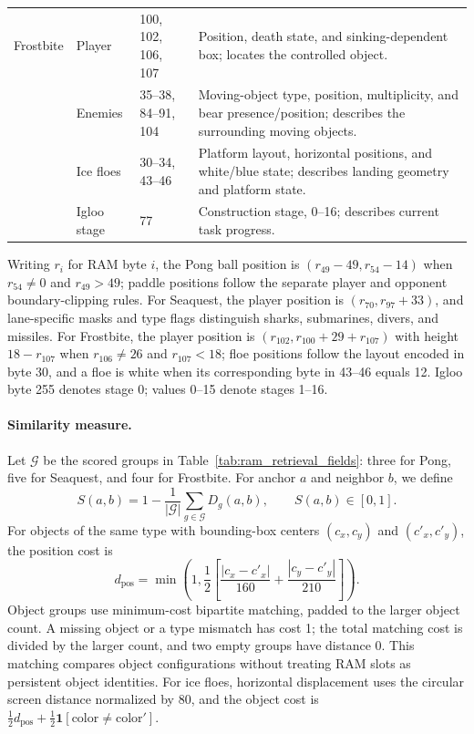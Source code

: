 \documentclass{article} %
\begin{document}
\begin{table}[!htbp]
\begin{tabular}{@{}p{}p{}p{}p{}@{}}
\midrule
Frostbite & Player & 100, 102, 106, 107 & Position, death state, and sinking-dependent box; locates the controlled object. \\
 & Enemies & 35--38, 84--91, 104 & Moving-object type, position, multiplicity, and bear presence/position; describes the surrounding moving objects. \\
 & Ice floes & 30--34, 43--46 & Platform layout, horizontal positions, and white/blue state; describes landing geometry and platform state. \\
 & Igloo stage & 77 & Construction stage, 0--16; describes current task progress. \\
\bottomrule
\end{tabular}
\end{table}

Writing $r_i$ for RAM byte $i$, the Pong ball position is $(r_{49}-49,r_{54}-14)$ when $r_{54}\neq0$ and $r_{49}>49$; paddle positions follow the separate player and opponent boundary-clipping rules. For Seaquest, the player position is $(r_{70},r_{97}+33)$, and lane-specific masks and type flags distinguish sharks, submarines, divers, and missiles. For Frostbite, the player position is $(r_{102},r_{100}+29+r_{107})$ with height $18-r_{107}$ when $r_{106}\neq26$ and $r_{107}<18$; floe positions follow the layout encoded in byte 30, and a floe is white when its corresponding byte in 43--46 equals 12. Igloo byte 255 denotes stage 0; values 0--15 denote stages 1--16.

\paragraph{Similarity measure.}
Let $\mathcal{G}$ be the scored groups in Table~\ref{tab:ram_retrieval_fields}: three for Pong, five for Seaquest, and four for Frostbite. For anchor $a$ and neighbor $b$, we define
\begin{equation}
S(a,b)=1-\frac{1}{|\mathcal{G}|}\sum_{g\in\mathcal{G}}D_g(a,b),
\qquad S(a,b)\in[0,1].
\label{eq:ram_retrieval_similarity}
\end{equation}
For objects of the same type with bounding-box centers $(c_x,c_y)$ and $(c'_x,c'_y)$, the position cost is
\begin{equation}
d_{\mathrm{pos}}=\min\!\left(1,\frac{1}{2}\left[\frac{|c_x-c'_x|}{160}+\frac{|c_y-c'_y|}{210}\right]\right).
\end{equation}
Object groups use minimum-cost bipartite matching, padded to the larger object count. A missing object or a type mismatch has cost 1; the total matching cost is divided by the larger count, and two empty groups have distance 0. This matching compares object configurations without treating RAM slots as persistent object identities. For ice floes, horizontal displacement uses the circular screen distance normalized by 80, and the object cost is $\tfrac12 d_{\mathrm{pos}}+\tfrac12\mathbf{1}[\mathrm{color}\neq\mathrm{color}']$.
\end{document}
